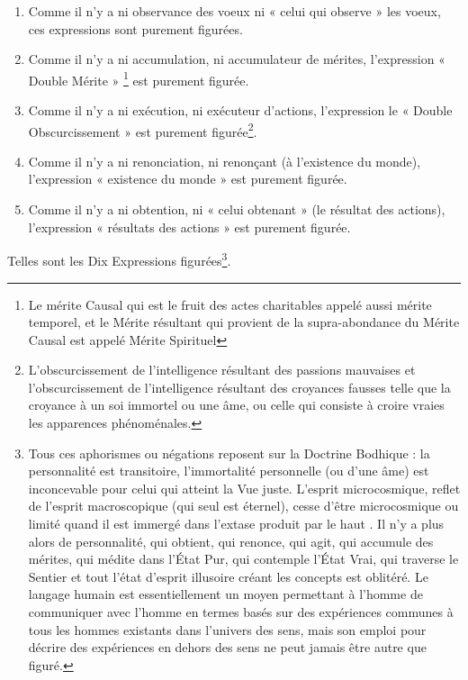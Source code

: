 \documentclass[10pt]{book}
\begin{document}
\begin{enumerate}[1.-]
\item Comme il n'y a ni observance des voeux ni « celui qui observe » les voeux, ces expressions sont purement figurées.
\item Comme il n'y a ni accumulation, ni accumulateur de mérites, l'expression « Double Mérite » \footnote{Le mérite Causal qui est le fruit des actes charitables appelé aussi mérite temporel, et le Mérite résultant qui provient de la supra-abondance du Mérite Causal est appelé Mérite Spirituel} est purement figurée. %
\item Comme il n'y a ni exécution, ni exécuteur d'actions, l'expression le « Double Obscurcissement » est purement figurée\footnote{L'obscurcissement de l'intelligence résultant des passions mauvaises et l'obscurcissement de l'intelligence résultant des croyances fausses telle que la croyance à un soi immortel ou une âme, ou celle qui consiste à croire vraies les apparences phénoménales.}.
\item Comme il n'y a ni renonciation, ni renonçant (à l'existence du monde), l'expression « existence du monde » est purement figurée.
\item Comme il n'y a ni obtention, ni « celui obtenant » (le résultat des actions), l'expression « résultats des actions » est purement figurée.
\end{enumerate}
Telles sont les Dix Expressions figurées\footnote{Tous ces aphorismes ou négations reposent sur la Doctrine Bodhique : la personnalité est transitoire, l'immortalité personnelle (ou d'une âme) est inconcevable pour celui qui atteint la Vue juste. L'esprit microcosmique, reflet de l'esprit macroscopique (qui seul est éternel), cesse d'être microcosmique ou limité quand il est immergé dans l'extase produit par le haut \samadhi. Il n'y a plus alors de personnalité, qui obtient, qui renonce, qui agit, qui accumule des mérites, qui médite dans l'État Pur, qui contemple l'État Vrai, qui traverse le Sentier et tout l'état d'esprit illusoire créant les concepts est oblitéré. Le langage humain est essentiellement un moyen permettant à l'homme de communiquer avec l'homme en termes basés sur des expériences communes à tous les hommes existants dans l'univers des sens, mais son emploi pour décrire des expériences en dehors des sens ne peut jamais être autre que figuré.}.
\end{document}
